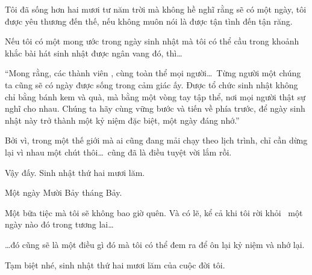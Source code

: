 \documentclass[../main.tex]{subfiles}
\begin{document}
Tôi đã sống hơn hai mươi tư năm trời mà không hề nghĩ rằng sẽ có một ngày, tôi được yêu thương đến thế, nếu không muôn nói là được tận tình đến tận răng.

Nếu tôi có một mong ước trong ngày sinh nhật mà tôi có thể cầu trong khoảnh khắc bài hát sinh nhật được ngân vang đó, thì\dots

\begin{center}
    ``Mong rằng, các thành viên \hll, cùng toàn thể mọi người\dots\ Từng người một chúng ta cũng sẽ có ngày được sống trong cảm giác ấy. Được tổ chức sinh nhật không chỉ bằng bánh kem và quà, mà bằng một vòng tay tập thể, nơi mọi người thật sự nghĩ cho nhau. Chúng ta hãy cùng vững bước và tiến về phía trước, để ngày sinh nhật này trở thành một kỷ niệm đặc biệt, một ngày đáng nhớ.''
\end{center}

Bởi vì, trong một thế giới mà ai cũng đang mải chạy theo lịch trình, chỉ cần dừng lại vì nhau một chút thôi\dots\ cũng đã là điều tuyệt vời lắm rồi.

Vậy đấy. Sinh nhật thứ hai mươi lăm.

Một ngày Mười Bảy tháng Bảy.

Một bữa tiệc mà tôi sẽ không bao giờ quên. Và có lẽ, kể cả khi tôi rời khỏi \hll\ một ngày nào đó trong tương lai\dots

\dots đó cũng sẽ là một điều gì đó mà tôi có thể đem ra để ôn lại kỷ niệm và nhớ lại.

Tạm biệt nhé, sinh nhật thứ hai mươi lăm của cuộc đời tôi.
\end{document}

